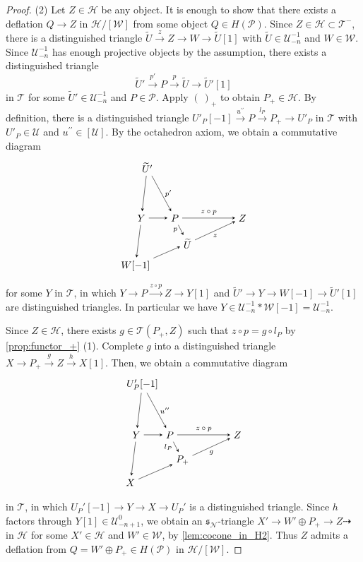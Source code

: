 \documentclass[a4paper,reqno,10pt]{amsart}
\DeclareRobustCommand{\darkblueedit}[1]{#1}
\theoremstyle{definition}
\theoremstyle{definition}
\theoremstyle{definition}
\theoremstyle{definition}
\theoremstyle{plain}
\newcommand{\fs}{\mathfrak{s}}
\newcommand{\CH}{\mathcal{H}}
\newcommand{\CN}{\mathcal{N}}
\newcommand{\CP}{\mathcal{P}}
\newcommand{\CT}{\mathcal{T}}
\newcommand{\CU}{\mathcal{U}}
\newcommand{\CW}{\mathcal{W}}
\begin{document}
\begin{proof}
{\rm (2)} Let $Z\in\CH$ be any object. It is enough to show that there exists a deflation $Q\to Z$ in $\CH/[\CW]$ from some object $Q\in H(\CP)$. Since $Z\in\CH\subset\CT^-$, there is a distinguished triangle 
$\widetilde U\xrightarrow{z}Z\to W\to \widetilde{U}[1]$
with $\widetilde{U}\in\CU_{-n}^{-1}$ and $W\in\CW$.
Since $\CU_{-n}^{-1}$ has enough projective objects by the assumption, there exists a distinguished triangle
\[
\widetilde{U}'\xrightarrow{p'} P\xrightarrow{p} \widetilde{U}\to \widetilde{U}'[1]
\]
\darkblueedit{in $\CT$ for some} $\widetilde{U}'\in\CU_{-n}^{-1}$ and $P\in\CP$. Apply $(\ )_+$ to obtain $P_+\in\CH$.
By definition, there is a distinguished triangle
$
U'_P[-1]\xrightarrow{u^{\prime\prime}}P\xrightarrow{l_P}P_+\to U'_P
$
in $\CT$ with $U'_P\in\CU$ and $u^{\prime\prime}\in[\CU]$.
By the octahedron axiom, we obtain a commutative diagram
\[
\begin{tikzpicture}[>=stealth]
\node (1) at (-0.98,1.8) {$\widetilde{U}'$};
\node (2) at (-1.19,0) {$Y$};
\node (3) at (-1.4,-1.7) {$W[-1]$};
\node (4) at (0,0) {$P$};
\node (5) at (0.45,-0.9) {$\widetilde{U}$};
\node (6) at (2.4,0) {$Z$};
\draw[->] (1) -- node[left,font=\scriptsize] {} (2);
\draw[->] (1) -- node[right,font=\scriptsize] {$p'$} (4);
\draw[->] (2) -- node[left,font=\scriptsize] {} (3);
\draw[->] (2) -- node[below,font=\scriptsize] {} (4);
\draw[->] (3) -- (5);
\draw[->] (4) -- node[left,font=\scriptsize] {$p$} (5);
\draw[->] (4) -- node[above,font=\scriptsize] {$z\circ p$} (6);
\draw[->] (5) -- node[below,font=\scriptsize] {$z$} (6);
\end{tikzpicture}
\]
for some $Y$ in $\CT$, in which $Y\to P\xrightarrow{z\circ p}Z\to Y[1]$ and $\widetilde{U}'\to Y\to W[-1]\to \widetilde{U}'[1]$ are distinguished triangles. 
In particular we have $Y\in\CU_{-n}^{-1}\ast\CW[-1]=\CU_{-n}^{-1}$.
 
Since $Z\in\CH$, there exists $g\in\CT(P_+,Z)$ such that $z\circ p=g\circ l_P$ by \cref{prop:functor_+} {\rm (1)}.
Complete $g$ into a distinguished triangle $X\to P_+\xrightarrow{g}Z\xrightarrow{h} X[1]$. Then, we obtain a commutative diagram
\[
\begin{tikzpicture}[>=stealth]
\node (11) at (6.02,1.8) {$U'_P[-1]$};
\node (12) at (5.81,0) {$Y$};
\node (13) at (5.6,-1.7) {$X$};
\node (14) at (7,0) {$P$};
\node (15) at (7.45,-0.9) {$P_+$};
\node (16) at (9.4,0) {$Z$};
\draw[->] (11) -- node[left,font=\scriptsize] {} (12);
\draw[->] (11) -- node[right,font=\scriptsize] {$u^{\prime\prime}$} (14);
\draw[->] (12) -- node[left,font=\scriptsize] {} (13);
\draw[->] (12) -- node[below,font=\scriptsize] {} (14);
\draw[->] (13) -- (15);
\draw[->] (14) -- node[left,font=\scriptsize] {$l_P$} (15);
\draw[->] (14) -- node[above,font=\scriptsize] {$z\circ p$} (16);
\draw[->] (15) -- node[below,font=\scriptsize] {$g$} (16);
\end{tikzpicture}
\]
in $\CT$, in which $U_P'[-1]\to Y\to X\to U_P'$ is a distinguished triangle.
Since $h$ factors through $Y[1]\in\CU_{-n+1}^0$, 
we obtain an $\fs_{\CN}$-triangle
$X' \to W'\oplus P_+\to Z\dashrightarrow$
in $\CH$ for some $X'\in\CH$ and $W'\in\CW$, by \cref{lem:cocone_in_H2}. Thus $Z$ admits a deflation from $Q=W'\oplus P_+\in H(\CP)$ in $\CH/[\CW]$.
\end{proof}
\end{document}

